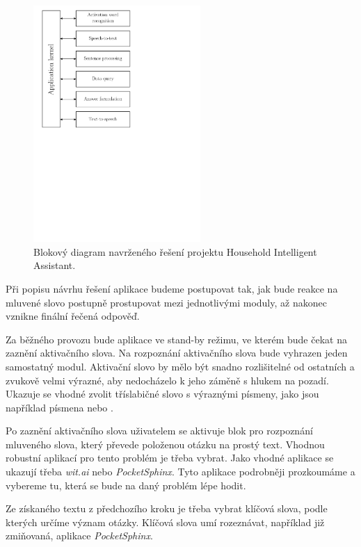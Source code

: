 \documentclass[12pt,a4paper]{article}
\begin{document}
\begin{figure}[ht]
	\begin{center}
	\includegraphics[height = 9cm]{blockDiagram.pdf}
	\caption{Blokový diagram navrženého řešení projektu Household Intelligent Assistant.}
	\label{fig:diagram api}
	\end{center}
\end{figure}

Při popisu návrhu řešení aplikace budeme postupovat tak, jak bude reakce na mluvené slovo postupně prostupovat mezi jednotlivými moduly, až nakonec vznikne finální řečená odpověď.

Za běžného provozu bude aplikace ve stand-by režimu, ve kterém bude čekat na zaznění aktivačního slova. Na rozpoznání aktivačního slova bude vyhrazen jeden samostatný modul. Aktivační slovo by mělo být snadno rozlišitelné od ostatních a zvukově velmi výrazné, aby nedocházelo k jeho záměně s hlukem na pozadí. Ukazuje se vhodné zvolit tříslabičné slovo s výraznými písmeny, jako jsou například písmena  nebo .

Po zaznění aktivačního slova uživatelem se aktivuje blok pro rozpoznání mluveného slova, který převede položenou otázku na prostý text. Vhodnou robustní aplikací pro tento problém je třeba vybrat. Jako vhodné aplikace se ukazují třeba \textit{wit.ai} nebo \textit{PocketSphinx}. Tyto aplikace podrobněji prozkoumáme a vybereme tu, která se bude na daný problém lépe hodit.

Ze získaného textu z předchozího kroku je třeba vybrat klíčová slova, podle kterých určíme význam otázky. Klíčová slova umí rozeznávat, například již zmiňovaná, aplikace \textit{PocketSphinx}.
\end{document}
